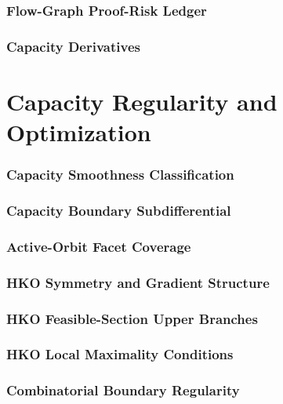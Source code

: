 \documentclass{article}
\begin{document}
\section{Flow-Graph Proof-Risk Ledger}


\section{Capacity Derivatives}


\part{Capacity Regularity and Optimization}

\section{Capacity Smoothness Classification}


\section{Capacity Boundary Subdifferential}


\section{Active-Orbit Facet Coverage}


\section{HKO Symmetry and Gradient Structure}


\section{HKO Feasible-Section Upper Branches}


\section{HKO Local Maximality Conditions}


\section{Combinatorial Boundary Regularity}

\end{document}
